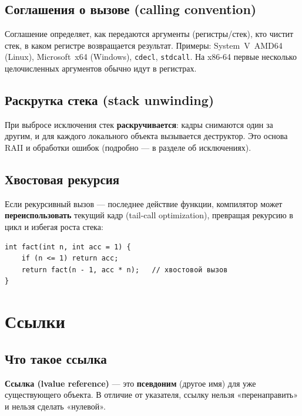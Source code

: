 \subsection{Соглашения о вызове (calling convention)}

Соглашение определяет, как передаются аргументы (регистры/стек), кто чистит стек,
в каком регистре возвращается результат. Примеры: System~V~AMD64 (Linux),
Microsoft~x64 (Windows), \texttt{cdecl}, \texttt{stdcall}. На x86-64 первые
несколько целочисленных аргументов обычно идут в регистрах.

\subsection{Раскрутка стека (stack unwinding)}

При выбросе исключения стек \textbf{раскручивается}: кадры снимаются один за
другим, и для каждого локального объекта вызывается деструктор. Это основа RAII
и обработки ошибок (подробно --- в разделе об исключениях).

\subsection{Хвостовая рекурсия}

Если рекурсивный вызов --- последнее действие функции, компилятор может
\textbf{переиспользовать} текущий кадр (tail-call optimization), превращая
рекурсию в цикл и избегая роста стека:

\begin{lstlisting}
int fact(int n, int acc = 1) {
    if (n <= 1) return acc;
    return fact(n - 1, acc * n);   // хвостовой вызов
}
\end{lstlisting}


\section{Ссылки}

\subsection{Что такое ссылка}

\textbf{Ссылка (lvalue reference)} --- это \textbf{псевдоним} (другое имя) для уже
существующего объекта. В отличие от указателя, ссылку нельзя «перенаправить» и
нельзя сделать «нулевой».

